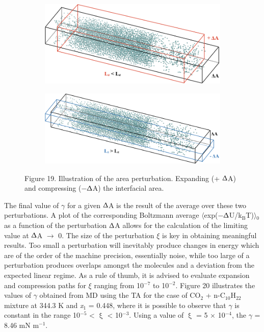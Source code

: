 \documentclass[9pt,bestpractices]{livecoms}
\begin{document}
\begin{figure}
  \centering
	\begin{subfigure}{\linewidth} %
    \includegraphics[width=1\textwidth]{gfx/image64.png}
	\end{subfigure}
	\begin{subfigure}{\linewidth} %
    \includegraphics[width=1\textwidth]{gfx/image65.png}
	\end{subfigure}
\caption{Figure 19. Illustration of the area perturbation. Expanding (+ {${\Updelta}$}A) and compressing (${-}${${\Updelta}$}A) the interfacial area.}
\label{fig:19}
\end{figure}

The final value of {${\gamma}$} for a given {\textbar}{${\Updelta}$}A{\textbar}
is the result of the average over these two perturbations. A plot of the
corresponding Boltzmann average
${\langle}$exp(${-}${${\Updelta}$}U/k$_{\mathrm{B}}$T)${\rangle}$$_{0}$ as
a function of the perturbation {\textbar}{${\Updelta}$}A{\textbar} allows for
the calculation of the limiting value at {${\Updelta}$}A ${\rightarrow}$ 0. The
size of the perturbation {${\xi}$} is key in obtaining meaningful results. Too
small a perturbation will inevitably produce changes in energy which are of the
order of the machine precision, essentially noise, while too large of
a perturbation produces overlaps amongst the molecules and a deviation from the
expected linear regime. As a rule of thumb, it is advised to evaluate expansion
and compression paths for {${\xi}$} ranging from 10$^{{-}7}$ to 10$^{{-}2}$.
Figure 20 illustrates the values of {${\gamma}$} obtained from MD using the TA
for the case of CO$_{2}$ + n-C$_{10}$H$_{22}$ mixture at 344.3 K and
\textit{x}$_{1}$ = 0.448, where it is possible to observe that {${\gamma}$} is
constant in the range 10$^{-5}$ {\textless} {${\upxi}$} {\textless} 10$^{-3}$.
Using a value of {${\upxi}$} = 5 ${\times}$ 10$^{-4}$, the {${\gamma}$} = 8.46
mN m$^{-1}$.\citep{muller2009} 
\end{document}
